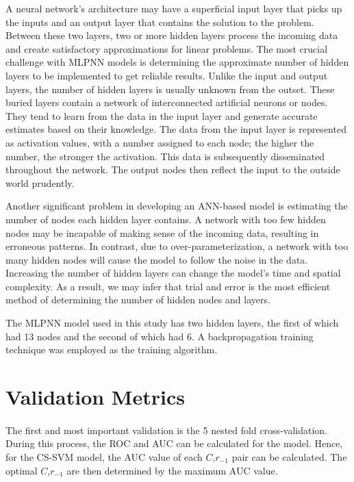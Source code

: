 \documentclass[10pt,twocolumn,letterpaper]{article}
\begin{document}
A neural network's architecture may have a superficial input layer that picks up the inputs and an output layer that contains the solution to the problem. Between these two layers, two or more hidden layers process the incoming data and create satisfactory approximations for linear problems. The most crucial challenge with MLPNN models is determining the approximate number of hidden layers to be implemented to get reliable results. Unlike the input and output layers, the number of hidden layers is usually unknown from the outset. These buried layers contain a network of interconnected artificial neurons or nodes. They tend to learn from the data in the input layer and generate accurate estimates based on their knowledge. The data from the input layer is represented as activation values, with a number assigned to each node; the higher the number, the stronger the activation. This data is subsequently disseminated throughout the network. The output nodes then reflect the input to the outside world prudently.

Another significant problem in developing an ANN-based model is estimating the number of nodes each hidden layer contains. A network with too few hidden nodes may be incapable of making sense of the incoming data, resulting in erroneous patterns. In contrast, due to over-parameterization, a network with too many hidden nodes will cause the model to follow the noise in the data. Increasing the number of hidden layers can change the model's time and spatial complexity. As a result, we may infer that trial and error is the most efficient method of determining the number of hidden nodes and layers.

The MLPNN model used in this study has two hidden layers, the first of which had 13 nodes and the second of which had 6. A backpropagation training technique was employed as the training algorithm\cite{backpro}.  


\section{Validation Metrics}
\paragraph{}The first and most important validation is the 5 nested fold cross-validation. During this process, the ROC and AUC can be calculated for the model. Hence, for the CS-SVM model, the AUC value of each $C$,$r_{-1}$ pair can be calculated. The optimal $C$,$r_{-1}$ are then determined by the maximum AUC value. 
\end{document}

